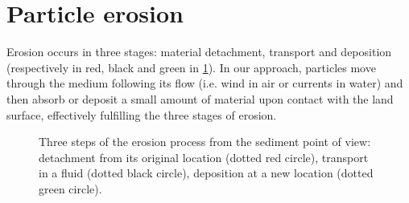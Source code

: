 






\section{Particle erosion}
\label{sec:erosion-method}
Erosion occurs in three stages: material detachment, transport and deposition (respectively in red, black and green in \cref{fig:erosion-ablation_erosion}). In our approach, particles move through the medium following its flow (i.e. wind in air or currents in water) and then absorb or deposit a small amount of material upon contact with the land surface, effectively fulfilling the three stages of erosion.
\begin{figure}
\caption{Three steps of the erosion process from the sediment point of view: detachment from its original location (dotted red circle), transport in a fluid (dotted black circle), deposition at a new location (dotted green circle).}
\label{fig:erosion-ablation_erosion}

\end{figure}
